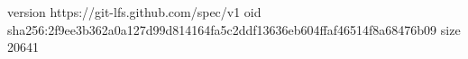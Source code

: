 version https://git-lfs.github.com/spec/v1
oid sha256:2f9ee3b362a0a127d99d814164fa5c2ddf13636eb604ffaf46514f8a68476b09
size 20641
